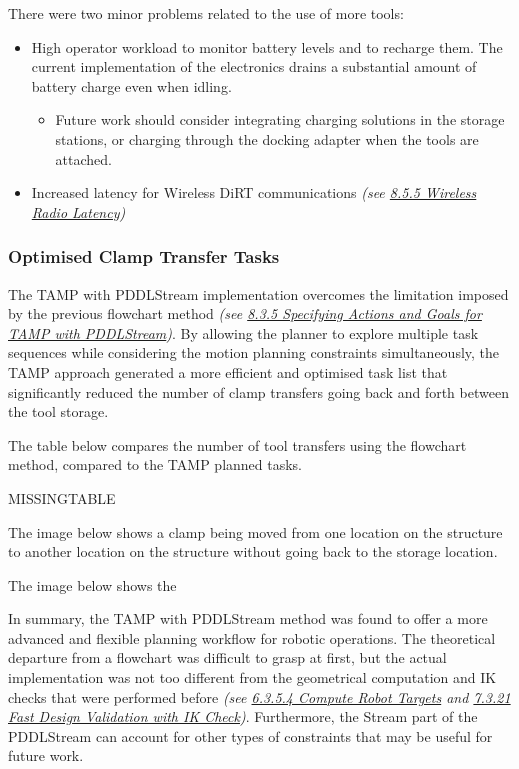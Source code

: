 


There were two minor problems related to the use of more tools:

\begin{itemize}
	\item High operator workload to monitor battery levels and to recharge them. The current implementation of the electronics drains a substantial amount of battery charge even when idling.

\begin{itemize}
	\item Future work should consider integrating charging solutions in the storage stations, or charging through the docking adapter when the tools are attached.

\end{itemize}
	\item Increased latency for Wireless DiRT communications\textit{ (see \ul{8.5.5 Wireless Radio Latency})}

\end{itemize}

\subsubsection{Optimised Clamp Transfer Tasks}

The TAMP with PDDLStream implementation overcomes the limitation imposed by the previous flowchart method \textit{(see \ul{8.3.5 Specifying Actions and Goals for TAMP with PDDLStream})}. By allowing the planner to explore multiple task sequences while considering the motion planning constraints simultaneously, the TAMP approach generated a more efficient and optimised task list that significantly reduced the number of clamp transfers going back and forth between the tool storage. 

The table below compares the number of tool transfers using the flowchart method, compared to the TAMP planned tasks.


MISSINGTABLE

The image below shows a clamp being moved from one location on the structure to another location on the structure without going back to the storage location.




The image below shows the 




In summary, the TAMP with PDDLStream method was found to offer a more advanced and flexible planning workflow for robotic operations. The theoretical departure from a flowchart was difficult to grasp at first, but the actual implementation was not too different from the geometrical computation and IK checks that were performed before \textit{(see \ul{6.3.5.4 Compute Robot Targets} and \ul{7.3.21 Fast Design Validation with IK Check})}. Furthermore, the Stream part of the PDDLStream can account for other types of constraints that may be useful for future work. 

